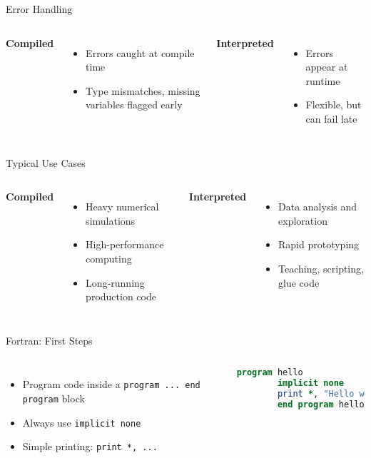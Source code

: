\begin{frame}{Error Handling}
	\begin{columns}[T]
		\textbf{Compiled}
		\begin{itemize}
			\item Errors caught at compile time
			\item Type mismatches, missing variables flagged early
		\end{itemize}
		
		\textbf{Interpreted}
		\begin{itemize}
			\item Errors appear at runtime
			\item Flexible, but can fail late
		\end{itemize}
	\end{columns}
\end{frame}


\begin{frame}{Typical Use Cases}
	\begin{columns}[T]
		\textbf{Compiled}
		\begin{itemize}
			\item Heavy numerical simulations
			\item High-performance computing
			\item Long-running production code
		\end{itemize}
		
		\textbf{Interpreted}
		\begin{itemize}
			\item Data analysis and exploration
			\item Rapid prototyping
			\item Teaching, scripting, glue code
		\end{itemize}
	\end{columns}
\end{frame}


\begin{frame}[fragile]{Fortran: First Steps}
		\begin{columns}[T]
		\begin{itemize}
		\item Program code inside a \texttt{program ... end program} block
		\item Always use \texttt{implicit none}
		\item Simple printing: \texttt{print *, ...}
		\end{itemize}
		\begin{lstlisting}[language=Fortran]
		program hello
		implicit none
		print *, "Hello world!"
		end program hello
		\end{lstlisting}
	\end{columns}


\end{frame}

